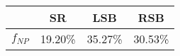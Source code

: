 \begin{tabular}{c|ccc}
 & SR & LSB & RSB \\
\hline
$f_{NP}$ & 19.20\% & 35.27\% & 30.53\% \\
\end{tabular}

